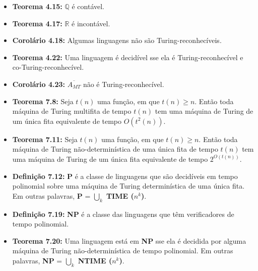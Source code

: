 \documentclass[12pt,a4paper,oneside]{article}
\begin{document}
\begin{itemize}
	\item[] {\bf Teorema 4.15:} $\mathbb{Q}$ é contável.
	\item[] {\bf Teorema 4.17:} $\mathbb{R}$ é incontável.
	\item[] {\bf Corolário 4.18:} Algumas linguagens não são Turing-reconhecíveis.
	\item[] {\bf Teorema 4.22:} Uma linguagem é decidível sse ela é Turing-reconhecível e co-Turing-reconhecível.
	\item[] {\bf Corolário 4.23:} $\overline{A_{MT}}$ não é Turing-reconhecível.
	\item[] {\bf Teorema 7.8: }
	Seja $t(n)$ uma função, em que $t(n) \geq n$. Então toda máquina de Turing multifita de tempo $t(n)$ tem uma máquina de Turing de um única fita equivalente de tempo $O(t^2(n))$.
	\item[] {\bf Teorema 7.11: }
	Seja $t(n)$ uma função, em que $t(n) \geq n$. Então toda máquina de Turing não-determinística de uma única fita de tempo $t(n)$ tem uma máquina de Turing de um única fita equivalente de tempo $2^{O(t(n))}$.	
	\item[] {\bf Definição 7.12: }
	{\bf P} é a classe de linguagens que são decidíveis em tempo polinomial sobre uma máquina de Turing determinística de uma única fita. Em outras palavras, {\bf P} = $\bigcup\limits_{k}$ {\bf TIME ($n^k$)}.
	\item[] {\bf Definição 7.19: }
	{\bf NP} é a classe das linguagens que têm verificadores de tempo polinomial.
	\item[] {\bf Teorema 7.20: }
	Uma linguagem está em {\bf NP} sse ela é decidida por alguma máquina de Turing não-determinística de tempo polinomial.  Em outras palavras, {\bf NP} = $\bigcup\limits_{k}$ {\bf NTIME ($n^k$)}.
\end{itemize}
\end{document}

